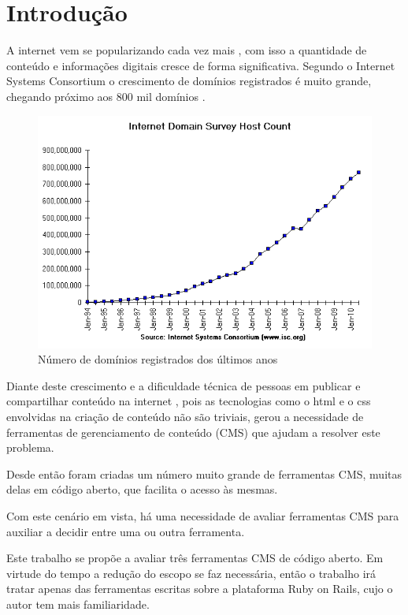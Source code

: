 \chapter{Introdução}

A internet vem se popularizando cada vez mais \cite{internet_stats}, com isso a quantidade de conteúdo e informações digitais cresce de forma significativa. Segundo o Internet Systems Consortium o crescimento de domínios registrados é muito grande, chegando próximo aos 800 mil domínios \cite{isc}. 

\begin{figure}[here]
\includegraphics[width=150mm]{images/isc_hosts.png}
\caption{Número de domínios registrados dos últimos anos}
\label{fig:isc_hosts.png}
\end{figure}

Diante deste crescimento e a dificuldade técnica de pessoas em publicar e compartilhar conteúdo na internet \cite{content_for_one}, pois as  tecnologias como o html e o css envolvidas na criação de conteúdo não são triviais, gerou a necessidade de ferramentas de gerenciamento de conteúdo (CMS) que ajudam a resolver este problema.

Desde então foram criadas um número muito grande de ferramentas CMS, muitas delas em código aberto, que facilita o acesso às mesmas. 

Com este cenário em vista, há uma necessidade de avaliar ferramentas CMS para auxiliar a decidir entre uma ou outra ferramenta. 

Este trabalho se propõe a avaliar três ferramentas CMS de código aberto. Em virtude do tempo a redução do escopo se faz necessária, então o trabalho irá tratar apenas das ferramentas escritas sobre a plataforma Ruby on Rails, cujo o autor tem mais familiaridade.

